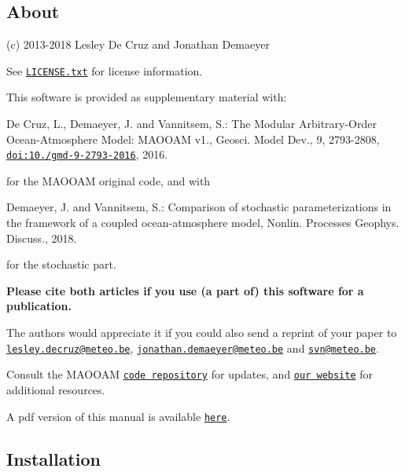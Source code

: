 \subsection*{About}

(c) 2013-\/2018 Lesley De Cruz and Jonathan Demaeyer

See \href{../../LICENSE.txt}{\tt L\+I\+C\+E\+N\+S\+E.\+txt} for license information.

This software is provided as supplementary material with\+:


\begin{DoxyItemize}
\item De Cruz, L., Demaeyer, J. and Vannitsem, S.\+: The Modular Arbitrary-\/\+Order Ocean-\/\+Atmosphere Model\+: M\+A\+O\+O\+AM v1., Geosci. Model Dev., 9, 2793-\/2808, \href{http://dx.doi.org/10.5194/gmd-9-2793-2016}{\tt doi\+:10./gmd-\/9-\/2793-\/2016}, 2016.
\end{DoxyItemize}

for the M\+A\+O\+O\+AM original code, and with


\begin{DoxyItemize}
\item Demaeyer, J. and Vannitsem, S.\+: Comparison of stochastic parameterizations in the framework of a coupled ocean-\/atmosphere model, Nonlin. Processes Geophys. Discuss., 2018.
\end{DoxyItemize}

for the stochastic part.

{\bfseries Please cite both articles if you use (a part of) this software for a publication.}

The authors would appreciate it if you could also send a reprint of your paper to \href{mailto:lesley.decruz@meteo.be}{\tt lesley.\+decruz@meteo.\+be}, \href{mailto:jonathan.demaeyer@meteo.be}{\tt jonathan.\+demaeyer@meteo.\+be} and \href{mailto:svn@meteo.be}{\tt svn@meteo.\+be}.

Consult the M\+A\+O\+O\+AM \href{http://www.github.com/Climdyn/MAOOAM}{\tt code repository} for updates, and \href{http://climdyn.meteo.be}{\tt our website} for additional resources.

A pdf version of this manual is available \href{../latex/Reference_manual.pdf}{\tt here}. 



\subsection*{Installation}

